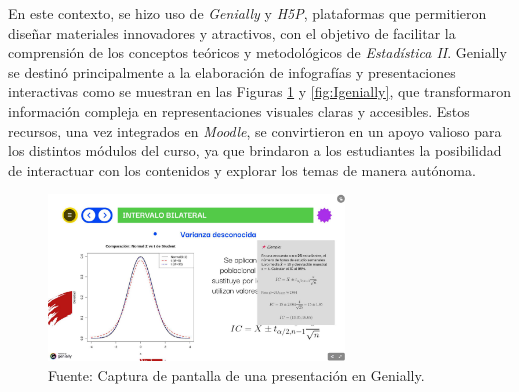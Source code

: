 \documentclass[letter,oneside,12pt,spanish]{report}
\begin{document}
En este contexto, se hizo uso de \textit{Genially} y \textit{H5P}, plataformas que permitieron diseñar materiales innovadores y atractivos, con el objetivo de facilitar la comprensión de los conceptos teóricos y metodológicos de \textit{Estadística II}. Genially se destinó principalmente a la elaboración de infografías y presentaciones interactivas como se muestran en las Figuras \ref{fig:Pgenially} y \ref{fig:Igenially}, que transformaron información compleja en representaciones visuales claras y accesibles. Estos recursos, una vez integrados en \textit{Moodle}, se convirtieron en un apoyo valioso para los distintos módulos del curso, ya que brindaron a los estudiantes la posibilidad de interactuar con los contenidos y explorar los temas de manera autónoma.

\begin{figure}[ht]
	\centering
	\includegraphics[width=0.7\textwidth]{Figs/Presentacion_Genially.pdf}
	\label{fig:Pgenially}
	\\Fuente: Captura de pantalla de una presentación en Genially.
\end{figure}
\end{document}
